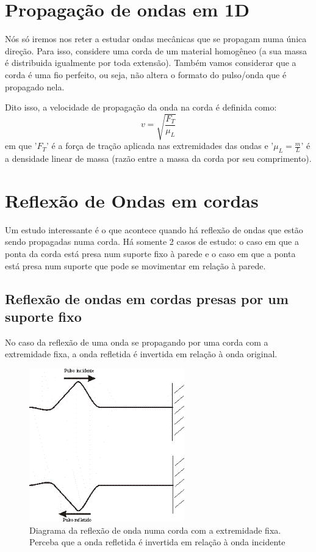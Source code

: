 \documentclass[12pt]{extarticle}
\newcommand{\<}{\langle}
\renewcommand{\>}{\rangle}
\theoremstyle{definition}
\begin{document}
\section{Propagação de ondas em 1D}

Nós só iremos nos reter a estudar ondas mecânicas que se propagam numa única direção. Para isso, considere uma corda de um material homogêneo (a sua massa é distribuida igualmente por toda extensão). Também vamos considerar que a corda é uma fio perfeito, ou seja, não altera o formato do pulso/onda que é propagado nela.

Dito isso, a velocidade de propagação da onda na corda é definida como:
\begin{equation}
    v = \sqrt{\frac{F_T}{\mu_L}}
\end{equation}
\noindent em que '$F_T$' é a força de tração aplicada nas extremidades das ondas e '$\mu_L = \frac{m}{L}$' é a densidade linear de massa (razão entre a massa da corda por seu comprimento).

\section{Reflexão de Ondas em cordas}
Um estudo interessante é o que acontece quando há reflexão de ondas que estão sendo propagadas numa corda. Há somente 2 casos de estudo: o caso em que a ponta da corda está presa num suporte fixo à parede e o caso em que a ponta está presa num suporte que pode se movimentar em relação à parede.

\subsection{Reflexão de ondas em cordas presas por um suporte fixo}

No caso da reflexão de uma onda se propagando por uma corda com a extremidade fixa, a onda refletida é invertida em relação à onda original.

\begin{figure}[H]
    \centering
    \includegraphics[width=0.6\textwidth]{refl1.png}
    \caption{Diagrama da reflexão de onda numa corda com a extremidade fixa. Perceba que a onda refletida é invertida em relação à onda incidente}
    \label{fig:reflexao_fixa}
\end{figure}
\end{document}
